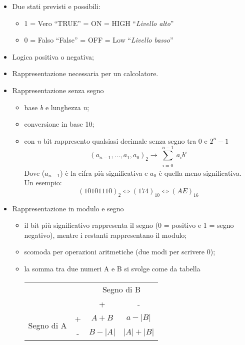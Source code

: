 \documentclass{book}
\newcommand{\abs}[1]{\lvert#1\rvert}
\begin{document}
\begin{itemize}
	\item Due stati previsti e possibili:
		\begin{itemize}
			\item 1 = Vero ``TRUE'' = ON = HIGH ``\textit{Livello alto}''
			\item 0 = Falso ``False'' = OFF = Low ``\textit{Livello basso}''
		\end{itemize}
	\item Logica positiva o negativa;
	\item Rappresentazione necessaria per un calcolatore.
	\item Rappresentazione senza segno
		\begin{itemize}
			\item base \textit{b} e lunghezza \textit{n};
			\item conversione in base 10;
			\item con \textit{n} bit rappresento qualsiasi decimale senza segno
				tra 0 e $2^n-1$
				\begin{equation}
					(a_{n-1},\dots, a_1,a_0)_2 \to
					\sum^{n-1}_{\substack{i=0}}a_ib^i
				\end{equation}
				Dove ($a_{n-1}$) è la cifra più significativa e $a_0$ è quella
				meno significativa.\\
				Un esempio:
				\begin{equation}
					(10101110)_2\Leftrightarrow (174)_{10} \Leftrightarrow
					(AE)_{16}
				\end{equation}
		\end{itemize}
	\item Rappresentazione in modulo e segno
		\begin{itemize}
			\item il bit più significativo rappresenta il segno (0 = positivo e
				1 = segno negativo), mentre i restanti rappresentano il modulo;
			\item scomoda per operazioni aritmetiche (due modi per scrivere 0);
			\item la somma tra due numeri A e B si svolge come da tabella
				\begin{table}[h!]
					\centering
					\begin{tabular}{l|ccc|}
						&&\multicolumn{2}{c|}{Segno di B} \\
						&&+&-\\
						\multirow{2}{*}{Segno di A}&+&$A+B$&$a-\abs B$\\
						&-&$B-\abs A$&$\abs A +\abs B$

\end{tabular}
\end{table}
\end{itemize}
\end{itemize}
\end{document}
